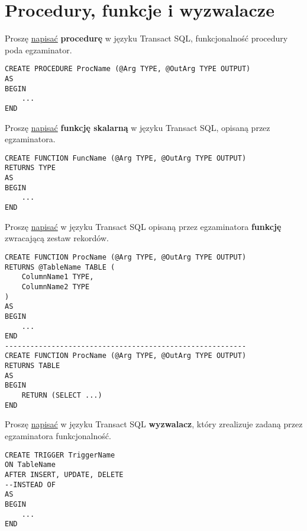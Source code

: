 \section{Procedury, funkcje i wyzwalacze}
\label{sec:procedury_funkcje_i_wyzwalacze}

\horrule{0.5pt}
Proszę \underline{napisać} \textbf{procedurę} w języku Transact SQL,
funkcjonalność procedury poda egzaminator.\\
\horrule{0.5pt}

\begin{verbatim}
CREATE PROCEDURE ProcName (@Arg TYPE, @OutArg TYPE OUTPUT)
AS
BEGIN
    ...
END
\end{verbatim}

\horrule{0.5pt}
Proszę \underline{napisać} \textbf{funkcję skalarną} w języku Transact SQL,
opisaną przez egzaminatora.\\
\horrule{0.5pt}

\begin{verbatim}
CREATE FUNCTION FuncName (@Arg TYPE, @OutArg TYPE OUTPUT)
RETURNS TYPE
AS
BEGIN
    ...
END
\end{verbatim}

\horrule{0.5pt}
Proszę \underline{napisać} w języku Transact SQL opisaną przez egzaminatora
\textbf{funkcję} zwracającą zestaw rekordów.\\
\horrule{0.5pt}

\begin{verbatim}
CREATE FUNCTION ProcName (@Arg TYPE, @OutArg TYPE OUTPUT)
RETURNS @TableName TABLE (
    ColumnName1 TYPE,
    ColumnName2 TYPE
)
AS
BEGIN
    ...
END
---------------------------------------------------------
CREATE FUNCTION ProcName (@Arg TYPE, @OutArg TYPE OUTPUT)
RETURNS TABLE
AS
BEGIN
    RETURN (SELECT ...)
END
\end{verbatim}

\horrule{0.5pt}
Proszę \underline{napisać} w języku Transact SQL \textbf{wyzwalacz}, który
zrealizuje zadaną przez egzaminatora funkcjonalność.\\
\horrule{0.5pt}

\begin{verbatim}
CREATE TRIGGER TriggerName
ON TableName
AFTER INSERT, UPDATE, DELETE
--INSTEAD OF
AS
BEGIN
    ...
END
\end{verbatim}
